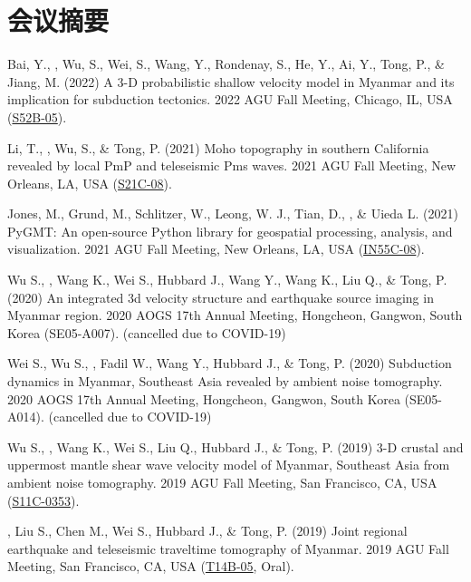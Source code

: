 \section{会议摘要}

\begin{etaremune}
\item Bai, Y., \Yao, Wu, S., Wei, S., Wang, Y., Rondenay, S., He, Y., Ai, Y., Tong, P., \& Jiang, M. (2022)
    A 3-D probabilistic shallow velocity model in Myanmar and its implication for subduction tectonics.
    2022 AGU Fall Meeting, Chicago, IL, USA (\href{https://agu.confex.com/agu/fm22/meetingapp.cgi/Paper/1195428}{S52B-05}).
\item Li, T., \Yao, Wu, S., \& Tong, P. (2021)
    Moho topography in southern California revealed by local PmP and teleseismic Pms waves.
    2021 AGU Fall Meeting, New Orleans, LA, USA (\href{https://agu.confex.com/agu/fm21/meetingapp.cgi/Paper/996937}{S21C-08}).
\item Jones, M., Grund, M., Schlitzer, W., Leong, W. J., Tian, D., \Yao, \& Uieda L. (2021)
    PyGMT: An open-source Python library for geospatial processing, analysis, and visualization.
    2021 AGU Fall Meeting, New Orleans, LA, USA (\href{http://adsabs.harvard.edu/abs/2017AGUFM.S43H2967Y}{IN55C-08}).
\item Wu S., \Yao, Wang K., Wei S., Hubbard J., Wang Y., Wang K., Liu Q., \& Tong, P. (2020)
    An integrated 3d velocity structure and earthquake source imaging in Myanmar region.
    2020 AOGS 17th Annual Meeting, Hongcheon, Gangwon, South Korea (SE05-A007). (cancelled due to COVID-19)
\item
    Wei S., Wu S., \Yao, Fadil W., Wang Y., Hubbard J., \& Tong, P. (2020)
    Subduction dynamics in Myanmar, Southeast Asia revealed by ambient noise tomography.
    2020 AOGS 17th Annual Meeting, Hongcheon, Gangwon, South Korea (SE05-A014). (cancelled due to COVID-19)
\item
    Wu S., \Yao, Wang K., Wei S., Liu Q., Hubbard J., \& Tong, P. (2019)
    3-D crustal and uppermost mantle shear wave velocity model of Myanmar, Southeast Asia from ambient noise tomography.
    2019 AGU Fall Meeting, San Francisco, CA, USA (\href{https://adsabs.harvard.edu/abs/2019AGUFM.S11C0353W}{S11C-0353}).
\item
    \Yao, Liu S., Chen M., Wei S., Hubbard J., \& Tong, P. (2019)
    Joint regional earthquake and teleseismic traveltime tomography of Myanmar.
    2019 AGU Fall Meeting, San Francisco, CA, USA (\href{http://adsabs.harvard.edu/abs/2019AGUFM.T14B..05Y}{T14B-05}, Oral).

\end{etaremune}
